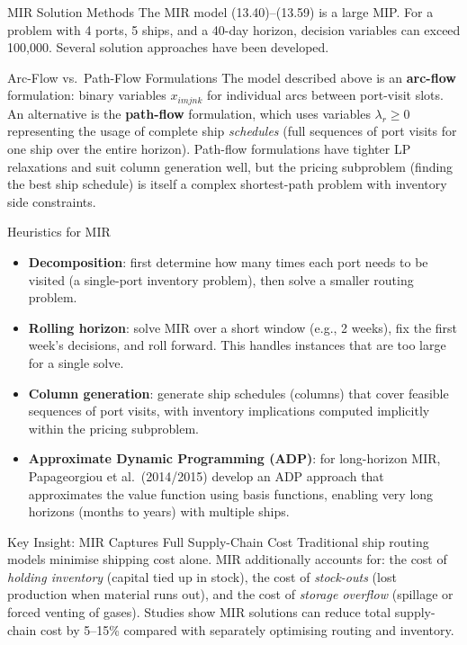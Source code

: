 \documentclass[aspectratio=169,10pt]{beamer}
\begin{document}
\begin{frame}[allowframebreaks]{MIR Solution Methods}
  The MIR model (13.40)--(13.59) is a large MIP.  For a problem with 4 ports,
  5 ships, and a 40-day horizon, decision variables can exceed 100{,}000.
  Several solution approaches have been developed.

  \medskip
  \begin{block}{Arc-Flow vs.\ Path-Flow Formulations}
    The model described above is an \textbf{arc-flow} formulation: binary
    variables $x_{imjnk}$ for individual arcs between port-visit slots.
    An alternative is the \textbf{path-flow} formulation, which uses variables
    $\lambda_r \geq 0$ representing the usage of complete ship \emph{schedules}
    (full sequences of port visits for one ship over the entire horizon).
    Path-flow formulations have tighter LP relaxations and suit column
    generation well, but the pricing subproblem (finding the best ship schedule)
    is itself a complex shortest-path problem with inventory side constraints.
  \end{block}

  \begin{block}{Heuristics for MIR}
    \begin{itemize}
      \item \textbf{Decomposition}: first determine how many times each port
            needs to be visited (a single-port inventory problem), then solve
            a smaller routing problem.
      \item \textbf{Rolling horizon}: solve MIR over a short window (e.g., 2
            weeks), fix the first week's decisions, and roll forward.  This
            handles instances that are too large for a single solve.
      \item \textbf{Column generation}: generate ship schedules (columns) that
            cover feasible sequences of port visits, with inventory implications
            computed implicitly within the pricing subproblem.
      \item \textbf{Approximate Dynamic Programming (ADP)}: for long-horizon
            MIR, Papageorgiou et al.\ (2014/2015) develop an ADP approach
            that approximates the value function using basis functions,
            enabling very long horizons (months to years) with multiple ships.
    \end{itemize}
  \end{block}

  \begin{alertblock}{Key Insight: MIR Captures Full Supply-Chain Cost}
    Traditional ship routing models minimise shipping cost alone.  MIR
    additionally accounts for: the cost of \emph{holding inventory} (capital
    tied up in stock), the cost of \emph{stock-outs} (lost production when
    material runs out), and the cost of \emph{storage overflow} (spillage or
    forced venting of gases).  Studies show MIR solutions can reduce total
    supply-chain cost by 5--15\% compared with separately optimising
    routing and inventory.
  \end{alertblock}


\end{frame}
\end{document}
